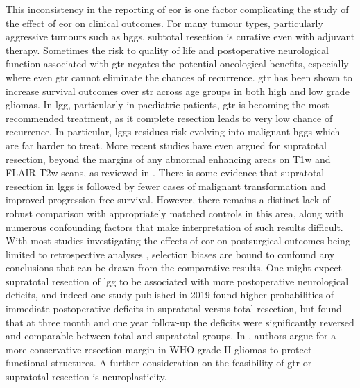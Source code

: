 This inconsistency in the reporting of \gls{eor} is one factor complicating the study of the effect of \gls{eor} on clinical outcomes.
For many tumour types, particularly aggressive tumours such as \glspl{hgg}, subtotal resection is  curative even with adjuvant therapy.
Sometimes the risk to quality of life and postoperative neurological function associated with \gls{gtr} negates the potential oncological benefits, especially where even \gls{gtr} cannot eliminate the chances of recurrence.
\Gls{gtr} has been shown to increase survival outcomes over \gls{str} across age groups in both high\autocite{Hatoum2022, Han2020, Adams2016, McCrea2015, Block2012, McGirt2009, Kramm2006} and low grade \autocite{Keles2001, Pollack1995, Sanai2008} gliomas.
In \gls{lgg}, particularly in paediatric patients, \gls{gtr} is becoming the most recommended treatment, as it complete resection leads to very low chance of recurrence.\autocite{Berger1994}
In particular, \glspl{lgg} residues risk evolving into malignant \glspl{hgg} which are far harder to treat.
More recent studies have even argued for supratotal resection, beyond the margins of any abnormal enhancing areas on T1w and FLAIR T2w scans, as reviewed in \textcite{deLeeuw2019}.
There is some evidence \autocite{Yordanova2011} that supratotal resection in \glspl{lgg} is followed by fewer cases of malignant transformation and improved progression-free survival.
However, there remains a distinct lack of robust comparison with appropriately matched controls in this area, along with numerous confounding factors that make interpretation of such results difficult.
With most studies investigating the effects of \gls{eor} on postsurgical outcomes being limited to retrospective analyses , selection biases are bound to confound any conclusions that can be drawn from the comparative results.\autocite{deLeeuw2019,Keles2001}
One might expect supratotal resection of \gls{lgg} to be associated with more postoperative neurological deficits, and indeed one study published in 2019 found higher probabilities of immediate postoperative deficits in supratotal versus total resection, but found that at three month and one year follow-up the deficits were significantly reversed and comparable between total and supratotal groups.\autocite{Rossi2019a}
In \textcite{Gil-Robles2010}, authors argue for a more conservative resection margin in WHO grade II gliomas to protect functional structures.
A further consideration on the feasibility of \gls{gtr} or supratotal resection is neuroplasticity.
